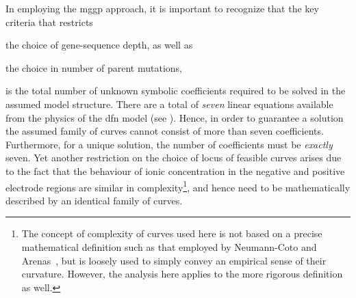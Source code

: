 In employing the \gls{mggp} approach, it  is important to recognize that the key
criteria that restricts
\begin{enumerate*}[label=\emph{\alph*})]
    \item the choice of  gene-sequence depth, as well as
    \item the choice in number of parent mutations,
\end{enumerate*}
is  the   total  number  of   unknown  symbolic  coefficients  required   to  be
solved  in the  assumed  model  structure. There  are  a  total of  \emph{seven}
linear   equations  available   from  the   physics  of   the  \gls{dfn}   model
(see ). Hence, in order to
guarantee  a solution  the  assumed  family of  curves  cannot  consist of  more
than  seven coefficients.  Furthermore, for  a  unique solution,  the number  of
coefficients must be \emph{exactly} seven. Yet another restriction on the choice
of locus of feasible  curves arises due to the fact that  the behaviour of ionic
concentration  in the  negative and  positive electrode  regions are  similar in
complexity\footnote{\label{fn:complexity}The  concept  of complexity  of  curves
used  here is  not  based on  a  precise mathematical  definition  such as  that
employed by Neumann-Coto and Arenas~\cite{Neumann-Coto2017}, but is loosely used
to simply  convey an empirical sense  of their curvature. However,  the analysis
here applies  to the more  rigorous definition as well.},  and hence need  to be
mathematically described by an identical family of curves.

